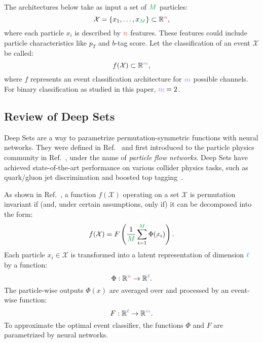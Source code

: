 \documentclass[aps,prd,twocolumn,superscriptaddress,floatfix,longbibliography,preprintnumbers,nofootinbib]{revtex4-1} %
\newcounter{para}
\newcommand{\reft}[1]{Ref.~\cite{#1}}
\begin{document}
The architectures below take as input a set of ${\color{c2}M}$ particles:
%
 \begin{equation}
 \mathcal X=\{x_1,\dots,x_{\color{c2}M}\}\subset \mathbb R^{\color{c1}n},
\end{equation}
  where each particle $x_i$ is described by ${\color{c1}n}$ features.
  These features could include particle characteristics like $p_T$ and $b$-tag score. 
  Let the classification of an event $\mathcal X$ be called:
  \begin{equation}
    f(\mathcal X) \subset \mathbb R^{{\color{c5}m}},
    \label{eq:general_notation}
  \end{equation} 
 where $f$ represents an event classification architecture for ${\color{c5}m}$ possible channels.
 For binary classification as studied in this paper, ${\color{c5}m}=2$.
 
 
\subsection{Review of Deep Sets}
  \label{sec:deepset}
  
Deep Sets are a way to parametrize permutation-symmetric functions with neural networks.
%
They were defined in \reft{Zaheer2017} and first introduced to the particle physics community in \reft{Komiske:2018cqr}, under the name of \emph{particle flow networks}.
%
Deep Sets have achieved state-of-the-art performance on various collider physics tasks, such as quark/gluon jet discrimination and boosted top tagging~\cite{Kasieczka:2019dbj}.


As shown in \reft{Zaheer2017}, a function $f(\mathcal X)$ operating on a set $\mathcal X$ is permutation invariant if (and, under certain assumptions, only if) it can be decomposed into the form:
%
    \begin{equation}
      f(\mathcal X) = F\left(\frac{1}{\color{c2} M} \sum_{i=1}^{{\color{c2} M}} \Phi(x_i) \right) .
    \label{eq:inv_deep_set}
    \end{equation}
Each particle $x_i\in \mathcal X$ is transformed into a latent representation of dimension ${\color{c3}\ell}$ by a function:
%
\begin{equation}
\Phi:\mathbb R^{\color{c1}n}\rightarrow \mathbb R^{\color{c3}\ell}.
\end{equation}
%
The particle-wise outputs $\Phi(x)$ are averaged over and processed by an event-wise function:
\begin{equation}
F:\mathbb R^{\color{c3}\ell} \rightarrow \mathbb R^{\color{c5}m}.
\end{equation}
%
To approximate the optimal event classifier, the functions $\Phi$ and $F$ are parametrized by neural networks.
\end{document}
